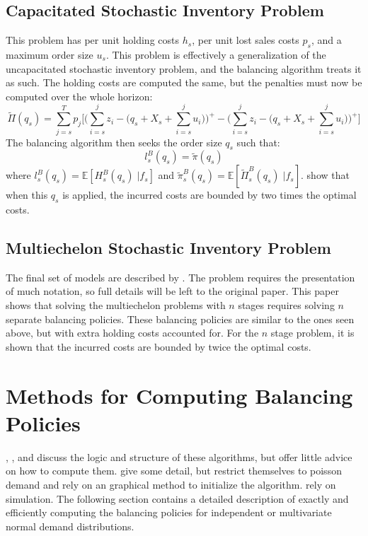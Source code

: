 \documentclass[12pt]{article}
\newcommand{\EX}{\mathbb{E}}
\begin{document}
\subsection{Capacitated Stochastic Inventory Problem}

This problem has per unit holding costs $h_s$, per unit lost sales costs $p_s$, and a maximum order size $u_s$. This problem is effectively a generalization of the uncapacitated stochastic inventory problem, and the balancing algorithm treats it as such. The holding costs are computed the same, but the penalties must now be computed over the whole horizon:
$$
	\tilde{\Pi}(q_s) = \sum_{j=s}^T p_j \big[\big(\sum_{i=s}^j z_i - (q_s + X_s + \sum_{i=s}^j u_i\big)\big)^+ - \big(\sum_{i=s}^j z_i - (q_s + X_s + \sum_{i=s}^j u_i\big)\big)^+\big]
$$
The balancing algorithm then seeks the order size $q_s$ such that:
$$
	l_s^B(q_s) = \tilde{\pi}(q_s)
$$
where $l_s^B(q_s) = \EX[H_s^B(q_s) \; | f_s]$ and $\tilde{\pi}_s^B(q_s) = \EX[\tilde{\Pi}_s^B(q_s) \; | f_s]$. \cite{levi:2008} show that when this $q_s$ is applied, the incurred costs are bounded by two times the optimal costs.

\subsection{Multiechelon Stochastic Inventory Problem}

The final set of models are described by \cite{levi:2016}. The problem requires the presentation of much notation, so full details will be left to the original paper. This paper shows that solving the multiechelon problems with $n$ stages requires solving $n$ separate balancing policies. These balancing policies are similar to the ones seen above, but with extra holding costs accounted for. For the $n$ stage problem, it is shown that the incurred costs are bounded by twice the optimal costs.

\section{Methods for Computing Balancing Policies}

\cite{levi:2007}, \cite{levi:2008}, and \cite{levi:2016} discuss the logic and structure of these algorithms, but offer little advice on how to compute them. \cite{yu:2010} give some detail, but restrict themselves to poisson demand and rely on an graphical method to initialize the algorithm. \cite{hurley:2007} rely on simulation. The following section contains a detailed description of exactly and efficiently computing the balancing policies for independent or multivariate normal demand distributions. 
\end{document}
